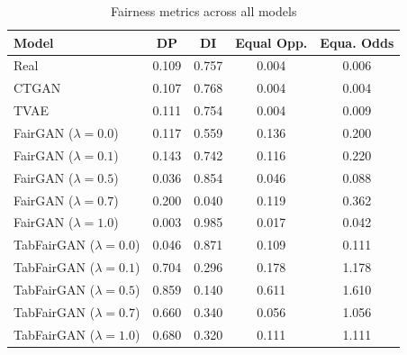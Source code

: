 \begin{table}[h!]
\caption{Fairness metrics across all models}
\label{tab:fairness}
\centering
\begin{tabular}{lcccc}
\toprule
Model & DP & DI & Equal Opp. & Equa. Odds \\
\midrule
Real & 0.109 & 0.757 & 0.004 & 0.006 \\
CTGAN & 0.107 & 0.768 & 0.004 & 0.004 \\
TVAE & 0.111 & 0.754 & 0.004 & 0.009 \\
FairGAN ($\lambda=0.0$) & 0.117 & 0.559 & 0.136 & 0.200 \\
FairGAN ($\lambda=0.1$) & 0.143 & 0.742 & 0.116 & 0.220 \\
FairGAN ($\lambda=0.5$) & 0.036 & 0.854 & 0.046 & 0.088 \\
FairGAN ($\lambda=0.7$) & 0.200 & 0.040 & 0.119 & 0.362 \\
FairGAN ($\lambda=1.0$) & 0.003 & 0.985 & 0.017 & 0.042 \\
TabFairGAN ($\lambda=0.0$) & 0.046 & 0.871 & 0.109 & 0.111 \\
TabFairGAN ($\lambda=0.1$) & 0.704 & 0.296 & 0.178 & 1.178 \\
TabFairGAN ($\lambda=0.5$) & 0.859 & 0.140 & 0.611 & 1.610 \\
TabFairGAN ($\lambda=0.7$) & 0.660 & 0.340 & 0.056 & 1.056 \\
TabFairGAN ($\lambda=1.0$) & 0.680 & 0.320 & 0.111 & 1.111 \\
\bottomrule
\end{tabular}
\end{table}
